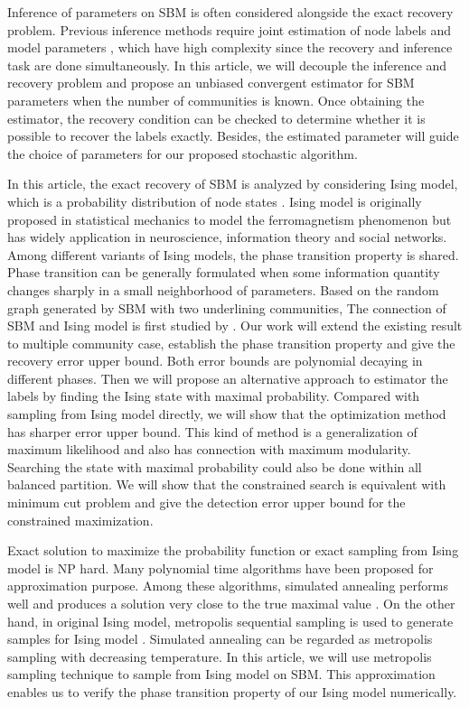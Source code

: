\documentclass[entropy,article,submit,moreauthors,pdftex]{Definitions/mdpi}
\newcommand{\1}{\mathbbm{1}}
\begin{document}
Inference of parameters on SBM is often considered alongside the exact recovery problem.
Previous inference methods require joint estimation of node labels and model parameters \cite{nowicki2001estimation}, which have high complexity since the recovery and inference task are done simultaneously.
In this article, we will decouple the inference and recovery problem and propose an unbiased convergent estimator for SBM parameters when the number of communities is known. Once obtaining the estimator, the recovery condition can be checked to determine whether it is possible to recover the labels
exactly. Besides, the estimated parameter will guide the choice of parameters for our proposed stochastic algorithm.

In this article, the exact recovery of SBM is analyzed by considering
Ising model, which is a probability distribution of node states \cite{ising1925beitrag}.
Ising model is originally proposed in statistical mechanics to model the ferromagnetism phenomenon but has widely application in neuroscience, information theory
and social networks. Among different variants of Ising models, the phase transition property is shared. Phase transition can be generally formulated when
some information quantity changes sharply in a small neighborhood of parameters.
Based on the random graph generated by SBM with two underlining communities,
The connection of SBM and Ising model is first studied by \cite{ye2020exact}. Our work will extend the existing result to multiple community case, establish the phase transition
property and give the recovery error upper bound. Both error bounds are polynomial decaying in different phases.
Then we will propose an alternative approach to estimator the labels by finding the Ising state with maximal probability.
Compared with sampling from Ising model directly,
we will show that the optimization method has sharper error upper bound. This kind of method
is a generalization of maximum likelihood and also has connection with maximum modularity.
Searching the state with maximal probability
could also be done within all balanced partition. We will show that the constrained search is equivalent with minimum cut problem and give the detection
error upper bound for the constrained maximization.

Exact solution to maximize the probability function or exact sampling from Ising model is NP hard. Many polynomial time algorithms have been proposed for approximation purpose.
Among these algorithms, simulated annealing performs well and produces a solution very close to the true maximal value \cite{liu2010detecting}.
On the other hand, in original Ising model,
metropolis sequential sampling is used to generate samples for Ising model \cite{metropolis1953equation}. Simulated annealing can be regarded as metropolis sampling with decreasing temperature. In this article, we will
use metropolis sampling technique to sample from Ising model on SBM. This approximation enables us to verify the phase transition property of our Ising model  numerically.
\end{document}
